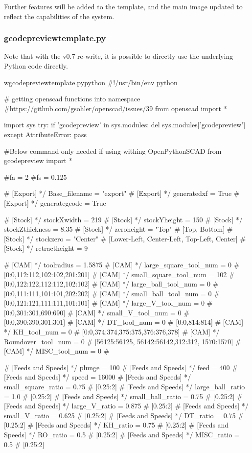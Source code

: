\documentclass{ltxdoc}
\begin{document}
Further features will be added to the template, and the main image updated to reflect the capabilities of the system.


\subsubsection{gcodepreviewtemplate.py}
           
Note that with the v0.7 re-write, it is possible to directly use the underlying Python code directly.

\lstset{firstnumber=1}%
\begin{writecode}{w}{gcodepreviewtemplate.py}{python}
#!/usr/bin/env python

# getting openscad functions into namespace
#https://github.com/gsohler/openscad/issues/39
from openscad import *

import sys
try:
    if 'gcodepreview' in sys.modules:
        del sys.modules['gcodepreview']
except AttributeError:
    pass

#Below command only needed if using withing OpenPythonSCAD
from gcodepreview import *

#fa = 2
#fs = 0.125

# [Export] */
Base_filename = "export" 
# [Export] */
generatedxf = True 
# [Export] */
generategcode = True 

# [Stock] */
stockXwidth = 219
# [Stock] */
stockYheight = 150
# [Stock] */
stockZthickness = 8.35
# [Stock] */
zeroheight = "Top" # [Top, Bottom]
# [Stock] */
stockzero = "Center" # [Lower-Left, Center-Left, Top-Left, Center]
# [Stock] */
retractheight = 9

# [CAM] */
toolradius = 1.5875
# [CAM] */
large_square_tool_num = 0 # [0:0,112:112,102:102,201:201]
# [CAM] */
small_square_tool_num = 102 # [0:0,122:122,112:112,102:102]
# [CAM] */
large_ball_tool_num = 0 # [0:0,111:111,101:101,202:202]
# [CAM] */
small_ball_tool_num = 0 # [0:0,121:121,111:111,101:101]
# [CAM] */
large_V_tool_num = 0 # [0:0,301:301,690:690]
# [CAM] */
small_V_tool_num = 0 # [0:0,390:390,301:301]
# [CAM] */
DT_tool_num = 0 # [0:0,814:814]
# [CAM] */
KH_tool_num = 0 # [0:0,374:374,375:375,376:376,378]
# [CAM] */
Roundover_tool_num = 0 # [56125:56125, 56142:56142,312:312, 1570:1570]
# [CAM] */
MISC_tool_num = 0 # 

# [Feeds and Speeds] */
plunge = 100
# [Feeds and Speeds] */
feed = 400
# [Feeds and Speeds] */
speed = 16000
# [Feeds and Speeds] */
small_square_ratio = 0.75 # [0.25:2]
# [Feeds and Speeds] */
large_ball_ratio = 1.0 # [0.25:2]
# [Feeds and Speeds] */
small_ball_ratio = 0.75 # [0.25:2]
# [Feeds and Speeds] */
large_V_ratio = 0.875 # [0.25:2]
# [Feeds and Speeds] */
small_V_ratio = 0.625 # [0.25:2]
# [Feeds and Speeds] */
DT_ratio = 0.75 # [0.25:2]
# [Feeds and Speeds] */
KH_ratio = 0.75 # [0.25:2]
# [Feeds and Speeds] */
RO_ratio = 0.5 # [0.25:2]
# [Feeds and Speeds] */
MISC_ratio = 0.5 # [0.25:2]


\end{writecode}
\end{document}
